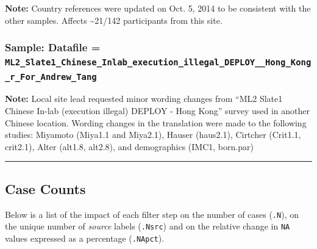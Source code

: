 \documentclass[]{article}
\begin{document}
\textbf{Note:} Country references were updated on Oct. 5, 2014 to be
consistent with the other samples. Affects \textasciitilde{}21/142
participants from this site.

\subsubsection{\textbf{Sample:} Datafile =
\texttt{ML2\_Slate1\_Chinese\_Inlab\_execution\_illegal\_DEPLOY\_\_Hong\_Kong\_r\_For\_Andrew\_Tang}}\label{sample-datafile-ml2ux5fslate1ux5fchineseux5finlabux5fexecutionux5fillegalux5fdeployux5fux5fhongux5fkongux5frux5fforux5fandrewux5ftang}

\textbf{Note:} Local site lead requested minor wording changes from
``ML2 Slate1 Chinese In-lab (execution illegal) DEPLOY - Hong Kong''
survey used in another Chinese location. Wording changes in the
translation were made to the following studies: Miyamoto (Miya1.1 and
Miya2.1), Hauser (haus2.1), Cirtcher (Crit1.1, crit2.1), Alter (alt1.8,
alt2.8), and demographics (IMC1, born.par)

\begin{center}\rule{0.5\linewidth}{\linethickness}\end{center}

\subsection{Case Counts}\label{case-counts}

Below is a list of the impact of each filter step on the number of cases
(\texttt{.N}), on the unique number of \emph{source} labels
(\texttt{.Nsrc}) and on the relative change in \texttt{NA} values
expressed as a percentage (\texttt{.NApct}).
\end{document}
